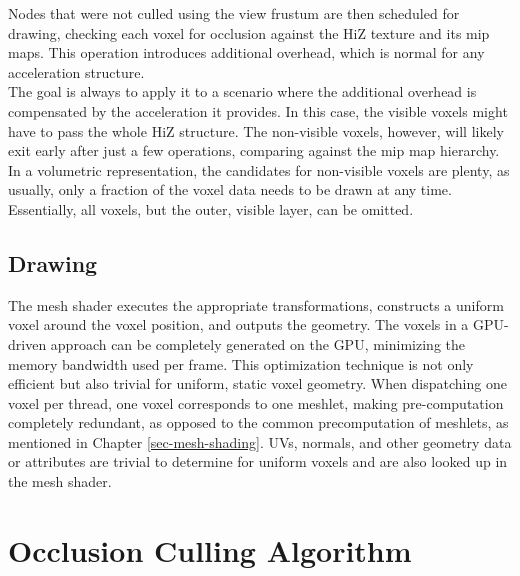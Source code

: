 \noindent
Nodes that were not culled using the view frustum are then scheduled for drawing, checking each voxel for occlusion against the 
\ac{HiZ} texture and its mip maps. This operation introduces additional overhead, which is normal for any acceleration structure. \\

\noindent
The goal is always to apply it to a scenario where the additional overhead is compensated by the acceleration it provides. 
In this case, the visible voxels might have to pass the whole \ac{HiZ} structure. The non-visible voxels, however, will likely 
exit early after just a few operations, comparing against the mip map hierarchy. In a volumetric representation, the candidates 
for non-visible voxels are plenty, as usually, only a fraction of the voxel data needs to be drawn at any time. Essentially, 
all voxels, but the outer, visible layer, can be omitted.

\subsection*{Drawing} \label{subsec-mesh-shader}

The mesh shader executes the appropriate transformations, constructs a uniform voxel around the voxel position, 
and outputs the geometry. The voxels in a \ac{GPU}-driven approach can be completely generated on the \ac{GPU}, 
minimizing the memory bandwidth used per frame. This optimization technique is not only efficient but also 
trivial for uniform, static voxel geometry. When dispatching one voxel per thread, one voxel corresponds 
to one meshlet, making pre-computation completely redundant, as opposed to the common precomputation of meshlets, 
as mentioned in Chapter \ref{sec-mesh-shading}. UVs, normals, and other geometry data or attributes are 
trivial to determine for uniform voxels and are also looked up in the mesh shader.


\section{Occlusion Culling Algorithm} \label{sec-occlusion}

